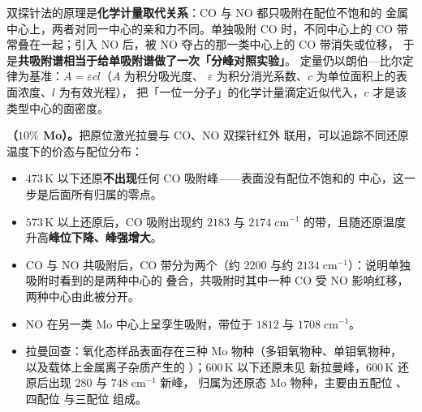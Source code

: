 \begin{principle}
双探针法的原理是\textbf{化学计量取代关系}：CO 与 NO 都只吸附在配位不饱和的
金属中心上，两者对同一中心的亲和力不同。单独吸附 CO 时，不同中心上的 CO
带常叠在一起；引入 NO 后，被 NO 夺占的那一类中心上的 CO 带消失或位移，
于是\textbf{共吸附谱相当于给单吸附谱做了一次「分峰对照实验」}。
定量仍以朗伯—比尔定律为基准：$A=\varepsilon c l$（$A$ 为积分吸光度、
$\varepsilon$ 为积分消光系数、$c$ 为单位面积上的表面浓度、$l$ 为有效光程），
把「一位一分子」的化学计量滴定近似代入，$c$ 才是该类型中心的面密度。
\end{principle}

\textbf{（$10\%$ Mo）。}把原位激光拉曼与 CO、NO 双探针红外
联用，可以追踪不同还原温度下的价态与配位分布：

\begin{itemize}
  \item $473$\,K 以下还原\textbf{不出现}任何 CO 吸附峰——表面没有配位不饱和的
        中心，这一步是后面所有归属的零点。
  \item $573$\,K 以上还原后，CO 吸附出现约 $2183$ 与 $2174\;\mathrm{cm^{-1}}$
        的带，且随还原温度升高\textbf{峰位下降、峰强增大}。
  \item CO 与 NO 共吸附后，CO 带分为两个（约 $2200$ 与约
        $2134\;\mathrm{cm^{-1}}$）：说明单独吸附时看到的是两种中心的
        叠合，共吸附时其中一种 CO 受 NO 影响红移，两种中心由此被分开。
  \item NO 在另一类 Mo 中心上呈孪生吸附，带位于 $1812$ 与
        $1708\;\mathrm{cm^{-1}}$。
  \item 拉曼回查：氧化态样品表面存在三种 Mo 物种（多钼氧物种、单钼氧物种，
        以及载体上金属离子杂质产生的 ）；$600$\,K 以下还原未见
        新拉曼峰，$600$\,K 还原后出现 $280$ 与 $748\;\mathrm{cm^{-1}}$ 新峰，
        归属为还原态 Mo 物种，主要由五配位 、四配位 
        与三配位  组成。
\end{itemize}

